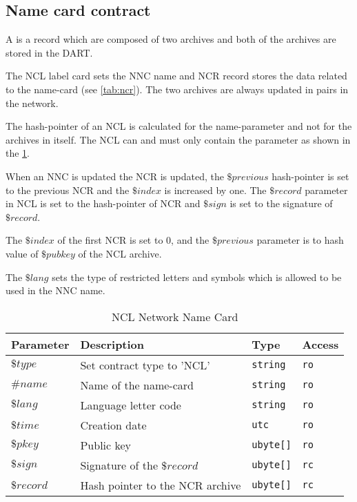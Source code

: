 \subsection{Name card contract} \label{sec:name_card_contract}
A  is a record which are composed of two archives  and  both of the archives are stored in the DART.

The NCL label card sets the NNC name and NCR record stores the data related to the name-card (see \cref{tab:ncr}). The two archives are always updated in pairs in the network.

The hash-pointer of an NCL is calculated for the name-parameter and not for the archives in itself. The NCL can and must only contain the parameter as shown in the  \cref{tab:ncl}.

When an NNC is updated the NCR is updated, the $\$previous$ hash-pointer is set to the previous NCR and the $\$index$ is increased by one. The $\$record$ parameter in NCL is set to the hash-pointer of NCR and $\$sign$ is set to the signature of $\$record$.

The $\$index$ of the first NCR is set to $0$, and the $\$previous$ parameter is to hash value of $\$pubkey$ of the NCL archive.

The $\$lang$ sets the type of restricted letters and symbols which is allowed to be used in the NNC name.


\begin{table}[H]
\begin{center}
\begin{tabular}{|l|p{7cm}|p{1.5cm}|l|}
      \hline
      Parameter & Description & Type & Access \\
      \hline
      $\$type$ & Set contract type to 'NCL' & \texttt{string} & \texttt{ro} \\
      \hline
      $\#name$ & Name of the name-card & \texttt{string} & \texttt{ro} \\
      \hline
      $\$lang$ & Language letter code & \texttt{string} & \texttt{ro} \\
      \hline
      $\$time$ & Creation date & \texttt{utc} & \texttt{ro} \\
      \hline
      $\$pkey$ & Public key & \texttt{ubyte[]} & \texttt{ro} \\
      \hline
      $\$sign$ & Signature of the $\$record$ & \texttt{ubyte[]} & \texttt{rc} \\
      \hline
      $\$record$ & Hash pointer to the NCR archive & \texttt{ubyte[]} & \texttt{rc} \\
      \hline
  \end{tabular}
\end{center}
\caption{NCL Network Name Card} 
\label{tab:ncl}
\end{table}

